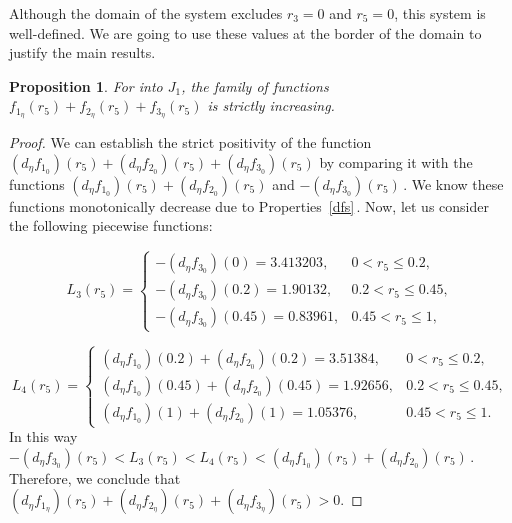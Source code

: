 \documentclass[final,11pt]{article}
\numberwithin{equation}{section}
\newtheorem{proposition}[theorem]{Proposition}
\theoremstyle{definition}
\begin{document}
Although the domain of the system excludes $r_{3}=0$ and $r_{5}=0$, this system is well-defined. We are going to use these values at the border of the domain to justify the main results.

\begin{proposition}\label{aux2}
For into $J_{1}$, the family of functions $f_{1_{\eta}}(r_{5})+f_{2_{\eta}}(r_{5})+f_{3_{\eta}}(r_{5})$ is strictly increasing.
\end{proposition}

\begin{proof}
We can establish the strict positivity of the function $\left(d_{\eta}f_{1_{0}}\right)(r_{5})+\left(d_{\eta}f_{2_{0}}\right)(r_{5}) +\left(d_{\eta}f_{3_{0}}\right)(r_{5})$ by comparing it with the functions $\left(d_{\eta}f_{1_{0}}\right)(r_{5})+\left(d_{\eta}f_{2_{0}}\right)(r_{5})$ and $-\left(d_{\eta}f_{3_{0}}\right)(r_{5})$\,. We know these functions monotonically decrease due to Properties~\ref{dfs}\,. Now, let us consider the following piecewise functions:

\begin{equation*}
L_{3}(r_5)= \left\{ \begin{array}{lll}
             -\left(d_{\eta}f_{3_{0}}\right)(0)=3.413203,  &0<r_{5}\leq 0.2, \\
             -\left(d_{\eta}f_{3_{0}}\right)(0.2)=1.90132, & 0.2<r_{5}\leq 0.45,\\
             -\left(d_{\eta}f_{3_{0}}\right)(0.45)=0.83961, & 0.45<r_{5}\leq 1,
\end{array}
   \right.
\end{equation*}

\begin{equation*}
L_{4}(r_5)= \left\{ \begin{array}{lll}
             \left(d_{\eta}f_{1_{0}}\right)(0.2)+ \left(d_{\eta}f_{2_{0}}\right)(0.2)=3.51384,  &0<r_{5}\leq 0.2, \\
             \left(d_{\eta}f_{1_{0}}\right)(0.45)+ \left(d_{\eta}f_{2_{0}}\right)(0.45)=1.92656, & 0.2<r_{5}\leq 0.45,\\
             \left(d_{\eta}f_{1_{0}}\right)(1)+ \left(d_{\eta}f_{2_{0}}\right)(1)=1.05376, & 0.45<r_{5}\leq 1.
\end{array}
   \right.
\end{equation*}
In this way $-\left(d_{\eta}f_{3_{0}}\right)(r_{5})<L_{3}(r_{5})<L_{4}(r_{5})<\left(d_{\eta}f_{1_{0}}\right)(r_{5})+\left(d_{\eta}f_{2_{0}}\right)(r_{5})$\,. Therefore, we conclude that $\left(d_{\eta}f_{1_{\eta}}\right)(r_{5})+\left(d_{\eta}f_{2_{\eta}}\right)(r_{5})+\left(d_{\eta}f_{3_{\eta}}\right)(r_{5})>0$.
\end{proof}
\end{document}
